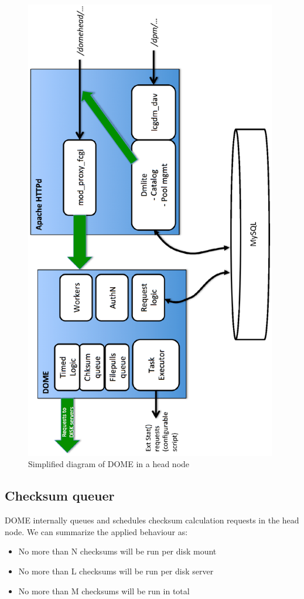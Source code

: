 \documentclass[a4paper]{jpconf}
\begin{document}
\begin{figure}
\begin{center}
 \includegraphics[width=11cm,keepaspectratio=true,angle=-90,origin=c]{./pics/domepics_head.eps}
 \caption{Simplified diagram of DOME in a head node}
 \label{figdomehead}
\end{center}

\end{figure}

\subsection{Checksum queuer}
 DOME internally queues and schedules checksum calculation requests in the head node. We can summarize the applied behaviour as:
 \begin{itemize}
  \item No more than N checksums will be run per disk mount\\
  \item No more than L checksums will be run per disk server\\
  \item No more than M checksums will be run in total\\
 \end{itemize}
 
\end{document}
